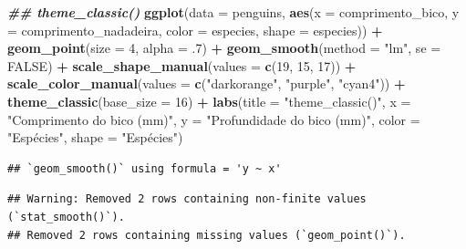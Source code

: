 \documentclass[
]{article}
\newenvironment{Shaded}{\begin{snugshade}}{\end{snugshade}}
\newcommand{\AttributeTok}[1]{\textcolor[rgb]{0.13,0.29,0.53}{#1}}
\newcommand{\ConstantTok}[1]{\textcolor[rgb]{0.56,0.35,0.01}{#1}}
\newcommand{\DecValTok}[1]{\textcolor[rgb]{0.00,0.00,0.81}{#1}}
\newcommand{\DocumentationTok}[1]{\textcolor[rgb]{0.56,0.35,0.01}{\textbf{\textit{#1}}}}
\newcommand{\FunctionTok}[1]{\textcolor[rgb]{0.13,0.29,0.53}{\textbf{#1}}}
\newcommand{\NormalTok}[1]{#1}
\newcommand{\SpecialCharTok}[1]{\textcolor[rgb]{0.81,0.36,0.00}{\textbf{#1}}}
\newcommand{\StringTok}[1]{\textcolor[rgb]{0.31,0.60,0.02}{#1}}
\begin{document}
\begin{Shaded}
\begin{Highlighting}[]
\DocumentationTok{\#\# theme\_classic()}
\FunctionTok{ggplot}\NormalTok{(}\AttributeTok{data =}\NormalTok{ penguins, }
       \FunctionTok{aes}\NormalTok{(}\AttributeTok{x =}\NormalTok{ comprimento\_bico, }\AttributeTok{y =}\NormalTok{ comprimento\_nadadeira,}
           \AttributeTok{color =}\NormalTok{ especies, }\AttributeTok{shape =}\NormalTok{ especies)) }\SpecialCharTok{+}
    \FunctionTok{geom\_point}\NormalTok{(}\AttributeTok{size =} \DecValTok{4}\NormalTok{, }\AttributeTok{alpha =}\NormalTok{ .}\DecValTok{7}\NormalTok{) }\SpecialCharTok{+}
    \FunctionTok{geom\_smooth}\NormalTok{(}\AttributeTok{method =} \StringTok{"lm"}\NormalTok{, }\AttributeTok{se =} \ConstantTok{FALSE}\NormalTok{) }\SpecialCharTok{+}
    \FunctionTok{scale\_shape\_manual}\NormalTok{(}\AttributeTok{values =} \FunctionTok{c}\NormalTok{(}\DecValTok{19}\NormalTok{, }\DecValTok{15}\NormalTok{, }\DecValTok{17}\NormalTok{)) }\SpecialCharTok{+}
    \FunctionTok{scale\_color\_manual}\NormalTok{(}\AttributeTok{values =} \FunctionTok{c}\NormalTok{(}\StringTok{"darkorange"}\NormalTok{, }\StringTok{"purple"}\NormalTok{, }\StringTok{"cyan4"}\NormalTok{)) }\SpecialCharTok{+}
    \FunctionTok{theme\_classic}\NormalTok{(}\AttributeTok{base\_size =} \DecValTok{16}\NormalTok{) }\SpecialCharTok{+}
    \FunctionTok{labs}\NormalTok{(}\AttributeTok{title =} \StringTok{"theme\_classic()"}\NormalTok{, }\AttributeTok{x =} \StringTok{"Comprimento do bico (mm)"}\NormalTok{, }
         \AttributeTok{y =} \StringTok{"Profundidade do bico (mm)"}\NormalTok{, }\AttributeTok{color =} \StringTok{"Espécies"}\NormalTok{, }\AttributeTok{shape =} \StringTok{"Espécies"}\NormalTok{)}
\end{Highlighting}
\end{Shaded}

\begin{verbatim}
## `geom_smooth()` using formula = 'y ~ x'
\end{verbatim}

\begin{verbatim}
## Warning: Removed 2 rows containing non-finite values (`stat_smooth()`).
## Removed 2 rows containing missing values (`geom_point()`).
\end{verbatim}
\end{document}
